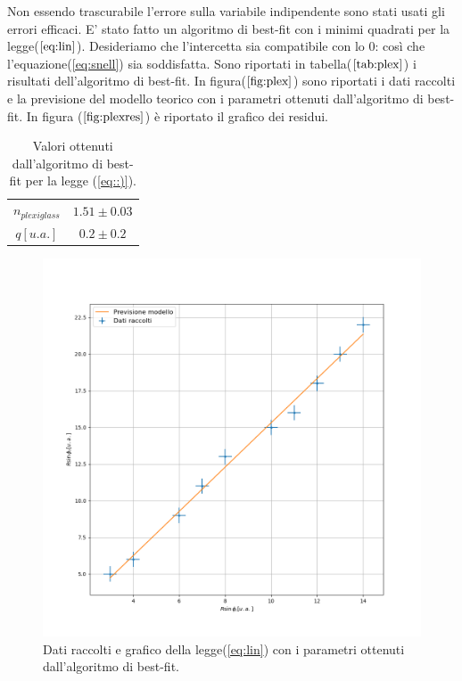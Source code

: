 \documentclass{article}
\begin{document}
Non essendo trascurabile l'errore sulla variabile indipendente sono stati usati gli errori efficaci.
E' stato fatto un algoritmo di best-fit con i minimi quadrati per la legge($\ref{eq:lin}$).
Desideriamo che l'intercetta sia compatibile con lo 0: così che l'equazione(\ref{eq:snell}) sia soddisfatta.
Sono riportati in tabella($\ref{tab:plex}$) i risultati dell'algoritmo di best-fit.
In figura($\ref{fig:plex}$) sono riportati i dati raccolti e la previsione del modello teorico con i parametri ottenuti dall'algoritmo di best-fit.
In figura ($\ref{fig:plexres}$) è riportato il grafico dei residui.


\begin{table}[!h]
		\centering
			\begin{tabular}{|cc|}
				\hline
				$n_{plexiglass}$ & $1.51 \pm 0.03$\\
				$q[u.a.]$ & $0.2 \pm 0.2$\\
				\hline
			\end{tabular}
		\caption{Valori ottenuti dall'algoritmo di best-fit per la legge (\ref{eq::)}).}
		\label{tab:plex}
		
\end{table}


\begin{figure}[h!]
	\includegraphics[width=\textwidth]{Dati_raccolti.png}
	\caption{Dati raccolti e grafico della legge(\ref{eq:lin}) con i parametri ottenuti dall'algoritmo di best-fit.}
	\label{fig:plex}
\end{figure}
\end{document}
